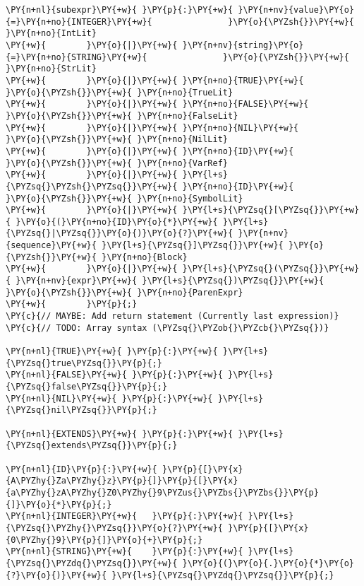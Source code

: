 \begin{Verbatim}[commandchars=\\\{\}]
\PY{n+nl}{subexpr}\PY{+w}{ }\PY{p}{:}\PY{+w}{ }\PY{n+nv}{value}\PY{o}{=}\PY{n+no}{INTEGER}\PY{+w}{               }\PY{o}{\PYZsh{}}\PY{+w}{ }\PY{n+no}{IntLit}
\PY{+w}{        }\PY{o}{|}\PY{+w}{ }\PY{n+nv}{string}\PY{o}{=}\PY{n+no}{STRING}\PY{+w}{               }\PY{o}{\PYZsh{}}\PY{+w}{ }\PY{n+no}{StrLit}
\PY{+w}{        }\PY{o}{|}\PY{+w}{ }\PY{n+no}{TRUE}\PY{+w}{                        }\PY{o}{\PYZsh{}}\PY{+w}{ }\PY{n+no}{TrueLit}
\PY{+w}{        }\PY{o}{|}\PY{+w}{ }\PY{n+no}{FALSE}\PY{+w}{                       }\PY{o}{\PYZsh{}}\PY{+w}{ }\PY{n+no}{FalseLit}
\PY{+w}{        }\PY{o}{|}\PY{+w}{ }\PY{n+no}{NIL}\PY{+w}{                         }\PY{o}{\PYZsh{}}\PY{+w}{ }\PY{n+no}{NilLit}
\PY{+w}{        }\PY{o}{|}\PY{+w}{ }\PY{n+no}{ID}\PY{+w}{                          }\PY{o}{\PYZsh{}}\PY{+w}{ }\PY{n+no}{VarRef}
\PY{+w}{        }\PY{o}{|}\PY{+w}{ }\PY{l+s}{\PYZsq{}\PYZsh{}\PYZsq{}}\PY{+w}{ }\PY{n+no}{ID}\PY{+w}{                      }\PY{o}{\PYZsh{}}\PY{+w}{ }\PY{n+no}{SymbolLit}
\PY{+w}{        }\PY{o}{|}\PY{+w}{ }\PY{l+s}{\PYZsq{}[\PYZsq{}}\PY{+w}{ }\PY{o}{(}\PY{n+no}{ID}\PY{o}{*}\PY{+w}{ }\PY{l+s}{\PYZsq{}|\PYZsq{}}\PY{o}{)}\PY{o}{?}\PY{+w}{ }\PY{n+nv}{sequence}\PY{+w}{ }\PY{l+s}{\PYZsq{}]\PYZsq{}}\PY{+w}{ }\PY{o}{\PYZsh{}}\PY{+w}{ }\PY{n+no}{Block}
\PY{+w}{        }\PY{o}{|}\PY{+w}{ }\PY{l+s}{\PYZsq{}(\PYZsq{}}\PY{+w}{ }\PY{n+nv}{expr}\PY{+w}{ }\PY{l+s}{\PYZsq{})\PYZsq{}}\PY{+w}{                }\PY{o}{\PYZsh{}}\PY{+w}{ }\PY{n+no}{ParenExpr}
\PY{+w}{        }\PY{p}{;}
\PY{c}{// MAYBE: Add return statement (Currently last expression)}
\PY{c}{// TODO: Array syntax (\PYZsq{}\PYZob{}\PYZcb{}\PYZsq{})}

\PY{n+nl}{TRUE}\PY{+w}{ }\PY{p}{:}\PY{+w}{ }\PY{l+s}{\PYZsq{}true\PYZsq{}}\PY{p}{;}
\PY{n+nl}{FALSE}\PY{+w}{ }\PY{p}{:}\PY{+w}{ }\PY{l+s}{\PYZsq{}false\PYZsq{}}\PY{p}{;}
\PY{n+nl}{NIL}\PY{+w}{ }\PY{p}{:}\PY{+w}{ }\PY{l+s}{\PYZsq{}nil\PYZsq{}}\PY{p}{;}

\PY{n+nl}{EXTENDS}\PY{+w}{ }\PY{p}{:}\PY{+w}{ }\PY{l+s}{\PYZsq{}extends\PYZsq{}}\PY{p}{;}

\PY{n+nl}{ID}\PY{p}{:}\PY{+w}{ }\PY{p}{[}\PY{x}{A\PYZhy{}Za\PYZhy{}z}\PY{p}{]}\PY{p}{[}\PY{x}{a\PYZhy{}zA\PYZhy{}Z0\PYZhy{}9\PYZus{}\PYZbs{}\PYZbs{}}\PY{p}{]}\PY{o}{*}\PY{p}{;}
\PY{n+nl}{INTEGER}\PY{+w}{   }\PY{p}{:}\PY{+w}{ }\PY{l+s}{\PYZsq{}\PYZhy{}\PYZsq{}}\PY{o}{?}\PY{+w}{ }\PY{p}{[}\PY{x}{0\PYZhy{}9}\PY{p}{]}\PY{o}{+}\PY{p}{;}
\PY{n+nl}{STRING}\PY{+w}{    }\PY{p}{:}\PY{+w}{ }\PY{l+s}{\PYZsq{}\PYZdq{}\PYZsq{}}\PY{+w}{ }\PY{o}{(}\PY{o}{.}\PY{o}{*}\PY{o}{?}\PY{o}{)}\PY{+w}{ }\PY{l+s}{\PYZsq{}\PYZdq{}\PYZsq{}}\PY{p}{;}


\end{Verbatim}
